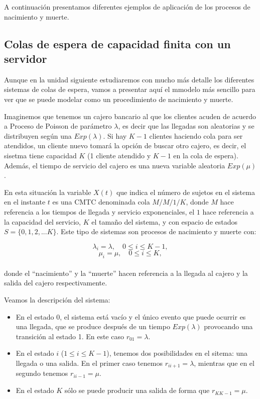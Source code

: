 \documentclass[
]{book}
\theoremstyle{definition}
\theoremstyle{definition}
\theoremstyle{definition}
\theoremstyle{definition}
\theoremstyle{remark}
\begin{document}
A continuación presentamos diferentes ejemplos de aplicación de los procesos de nacimiento y muerte.

\hypertarget{colas-de-espera-de-capacidad-finita-con-un-servidor}{%
\subsection{Colas de espera de capacidad finita con un servidor}\label{colas-de-espera-de-capacidad-finita-con-un-servidor}}

Aunque en la unidad siguiente estudiaremos con mucho más detalle los diferentes sistemas de colas de espera, vamos a presentar aquí el mmodelo más sencillo para ver que se puede modelar como un procedimiento de nacimiento y muerte.

Imaginemos que tenemos un cajero bancario al que los clientes acuden de acuerdo a Proceso de Poisson de parámetro \(\lambda\), es decir que las llegadas son aleatorias y se distribuyen según una \(Exp(\lambda)\). Si hay \(K-1\) clientes haciendo cola para ser atendidos, un cliente nuevo tomará la opción de buscar otro cajero, es decir, el sisetma tiene capacidad \(K\) (1 cliente atendido y \(K-1\) en la cola de espera). Además, el tiempo de servicio del cajero es una nueva variable aleatoria \(Exp(\mu)\).

En esta situación la variable \(X(t)\) que indica el número de sujetos en el sistema en el instante \(t\) es una CMTC denominada cola \(M/M/1/K\), donde \(M\) hace referencia a los tiempos de llegada y servicio exponenciales, el \(1\) hace referencia a la capacidad del servicio, \(K\) el tamaño del sistema, y con espacio de estados \(S = \{0, 1, 2,...K \}\). Este tipo de sistemas son procesos de nacimiento y muerte con:

\[\lambda_i = \lambda, \quad 0 \leq i \leq K-1,\] \[\mu_i = \mu, \quad 0 \leq i \leq K,\]\\
donde el ``nacimiento'' y la ``muerte'' hacen referencia a la llegada al cajero y la salida del cajero respectivamente.

Veamos la descripción del sistema:

\begin{itemize}
\item
  En el estado 0, el sistema está vacío y el único evento que puede ocurrir es una llegada, que se produce después de un tiempo \(Exp(\lambda)\) provocando una transición al estado 1. En este caso \(r_{01} = \lambda\).
\item
  En el estado \(i\) (\(1 \leq i \leq K-1\)), tenemos dos posibilidades en el sitema: una llegada o una salida. En el primer caso tenemos \(r_{i i+1} = \lambda\), mientras que en el segundo tenemos \(r_{i i-1} = \mu\).
\item
  En el estado \(K\) sólo se puede producir una salida de forma que \(r_{K K-1} = \mu\).
\end{itemize}
\end{document}
